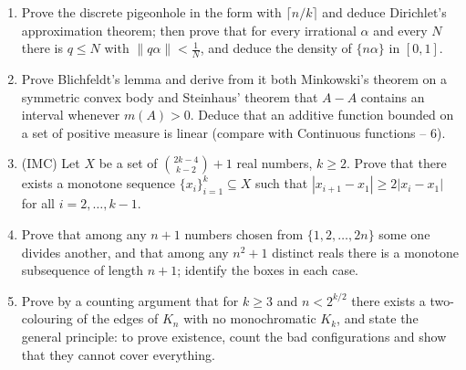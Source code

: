 \documentclass[11pt,a4paper]{article}
\renewcommand{\le}{\leqslant}
\renewcommand{\ge}{\geqslant}
\begin{document}
\begin{enumerate}[leftmargin=2.2em,itemsep=0.6em]
\item Prove the discrete pigeonhole in the form with $\lceil n/k\rceil$ and deduce Dirichlet's
approximation theorem; then prove that for every irrational $\alpha$ and every $N$ there is
$q\le N$ with $\|q\alpha\|<\frac1N$, and deduce the density of $\{n\alpha\}$ in $[0,1]$.

\item Prove Blichfeldt's lemma and derive from it both Minkowski's theorem on a symmetric convex
body and Steinhaus' theorem that $A-A$ contains an interval whenever $m(A)>0$. Deduce that an
additive function bounded on a set of positive measure is linear (compare with Continuous
functions -- 6).

\item (IMC) Let $X$ be a set of $\binom{2k-4}{k-2}+1$ real numbers, $k\ge2$. Prove that there
exists a monotone sequence $\{x_i\}_{i=1}^k\subseteq X$ such that $|x_{i+1}-x_1|\ge2|x_i-x_1|$
for all $i=2,\dots,k-1$.

\item Prove that among any $n+1$ numbers chosen from $\{1,2,\dots,2n\}$ some one divides
another, and that among any $n^2+1$ distinct reals there is a monotone subsequence of length
$n+1$; identify the boxes in each case.

\item Prove by a counting argument that for $k\ge3$ and $n<2^{k/2}$ there exists a
two-colouring of the edges of $K_n$ with no monochromatic $K_k$, and state the general
principle: to prove existence, count the bad configurations and show that they cannot cover
everything.
\end{enumerate}
\end{document}
